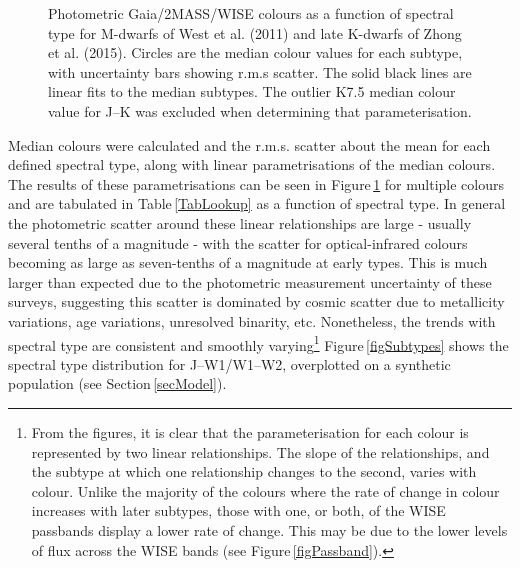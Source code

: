\begin{figure}
    \caption{Photometric Gaia/2MASS/WISE colours as a function of spectral type for M-dwarfs of West et al. (2011) and late K-dwarfs of Zhong et al. (2015). Circles are the median colour values for each subtype, with uncertainty bars showing r.m.s scatter. The solid black lines are linear fits to the median subtypes. The outlier K7.5 median colour value for J--K was excluded when determining that parameterisation.}
	\label{FigRelationship}
\end{figure}

Median colours were calculated and the r.m.s. scatter about the mean for each \citealt{2011West} defined spectral type, along with linear parametrisations of the median colours. The results of these parametrisations can be seen in Figure\,\ref{FigRelationship} for multiple colours and are tabulated in Table\,\ref{TabLookup} as a function of spectral type. In general the photometric scatter around these linear relationships are large - usually several tenths of a magnitude - with the scatter for optical-infrared colours becoming as large as seven-tenths of a magnitude at early types. This is much larger than expected due to the photometric measurement uncertainty of these surveys, suggesting this scatter is dominated by cosmic scatter due to metallicity variations, age variations, unresolved binarity, etc. Nonetheless, the trends with spectral type are consistent and smoothly varying\footnote{From the figures, it is clear that the parameterisation for each colour is represented by two linear relationships. The slope of the relationships, and the subtype at which one relationship changes to the second, varies with colour. Unlike the majority of the colours where the rate of change in colour increases with later subtypes, those with one, or both, of the WISE passbands display a lower rate of change. This may be due to the lower levels of flux across the WISE bands (see Figure\,\ref{figPassband}).} Figure\,\ref{figSubtypes} shows the spectral type distribution for J--W1/W1--W2, overplotted on a synthetic population (see Section\,\ref{secModel}).

